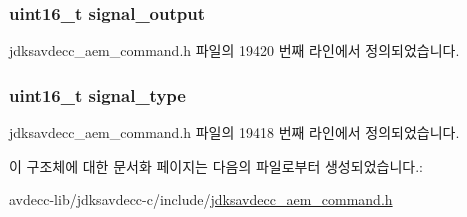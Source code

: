 \subsubsection[{\texorpdfstring{signal\+\_\+output}{signal_output}}]{\setlength{\rightskip}{0pt plus 5cm}uint16\+\_\+t signal\+\_\+output}\hypertarget{structjdksavdecc__aem__command__set__signal__selector__response_ab4b91864e6fc335d7e86536d9f4461e4}{}\label{structjdksavdecc__aem__command__set__signal__selector__response_ab4b91864e6fc335d7e86536d9f4461e4}


jdksavdecc\+\_\+aem\+\_\+command.\+h 파일의 19420 번째 라인에서 정의되었습니다.

\subsubsection[{\texorpdfstring{signal\+\_\+type}{signal_type}}]{\setlength{\rightskip}{0pt plus 5cm}uint16\+\_\+t signal\+\_\+type}\hypertarget{structjdksavdecc__aem__command__set__signal__selector__response_a248e60ef99d5ed1779989d1dd6b6dc5a}{}\label{structjdksavdecc__aem__command__set__signal__selector__response_a248e60ef99d5ed1779989d1dd6b6dc5a}


jdksavdecc\+\_\+aem\+\_\+command.\+h 파일의 19418 번째 라인에서 정의되었습니다.



이 구조체에 대한 문서화 페이지는 다음의 파일로부터 생성되었습니다.\+:\begin{DoxyCompactItemize}
\item 
avdecc-\/lib/jdksavdecc-\/c/include/\hyperlink{jdksavdecc__aem__command_8h}{jdksavdecc\+\_\+aem\+\_\+command.\+h}\end{DoxyCompactItemize}
